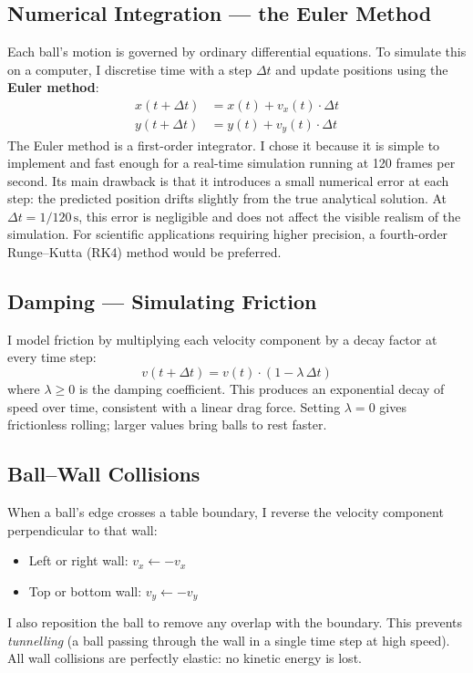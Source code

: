 \documentclass[12pt, letterpaper]{article}
\begin{document}
\subsection*{Numerical Integration --- the Euler Method}
Each ball's motion is governed by ordinary differential equations.
To simulate this on a computer, I discretise time with a step
$\Delta t$ and update positions using the \textbf{Euler method}:
\begin{align}
  x(t+\Delta t) &= x(t) + v_x(t)\cdot\Delta t \\
  y(t+\Delta t) &= y(t) + v_y(t)\cdot\Delta t
\end{align}
The Euler method is a first-order integrator.
I chose it because it is simple to implement and fast enough for
a real-time simulation running at 120 frames per second.
Its main drawback is that it introduces a small numerical error
at each step: the predicted position drifts slightly from the
true analytical solution.
At $\Delta t = 1/120\,\text{s}$, this error is negligible and
does not affect the visible realism of the simulation.
For scientific applications requiring higher precision,
a fourth-order Runge--Kutta (RK4) method would be preferred.
\subsection*{Damping --- Simulating Friction}
I model friction by multiplying each velocity component by a
decay factor at every time step:
\begin{equation}
  v(t+\Delta t) = v(t)\cdot(1 - \lambda\,\Delta t)
\end{equation}
where $\lambda \geq 0$ is the damping coefficient.
This produces an exponential decay of speed over time, consistent
with a linear drag force.
Setting $\lambda = 0$ gives frictionless rolling; larger values
bring balls to rest faster.
\subsection*{Ball--Wall Collisions}
When a ball's edge crosses a table boundary, I reverse the velocity
component perpendicular to that wall:
\begin{itemize}[noitemsep]
  \item Left or right wall: $v_x \leftarrow -v_x$
  \item Top or bottom wall: $v_y \leftarrow -v_y$
\end{itemize}
I also reposition the ball to remove any overlap with the boundary.
This prevents \textit{tunnelling} (a ball passing through the wall
in a single time step at high speed).
All wall collisions are perfectly elastic: no kinetic energy is lost.
\end{document}
